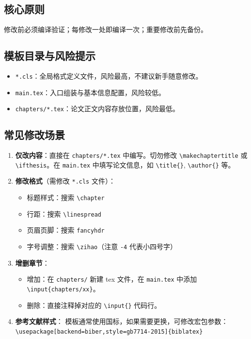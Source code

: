 \subsection{核心原则}
修改前必须编译验证；每修改一处即编译一次；重要修改前先备份。

\subsection{模板目录与风险提示}
\begin{itemize}
    \item \texttt{*.cls}：全局格式定义文件，风险最高，不建议新手随意修改。
    \item \texttt{main.tex}：入口组装与基本信息配置，风险较低。
    \item \texttt{chapters/*.tex}：论文正文内容存放位置，风险最低。
\end{itemize}

\subsection{常见修改场景}
\begin{enumerate}
    \item \textbf{仅改内容}：直接在 \texttt{chapters/*.tex} 中编写。切勿修改 \texttt{\textbackslash makechaptertitle} 或 \texttt{\textbackslash ifthesis}。在 \texttt{main.tex} 中填写论文信息，如 \texttt{\textbackslash title\{\}}, \texttt{\textbackslash author\{\}} 等。
    \item \textbf{修改格式}（需修改 \texttt{*.cls} 文件）：
    \begin{itemize}
        \item 标题样式：搜索 \texttt{\textbackslash chapter}
        \item 行距：搜索 \texttt{\textbackslash linespread}
        \item 页眉页脚：搜索 \texttt{fancyhdr}
        \item 字号调整：搜索 \texttt{\textbackslash zihao}（注意 \texttt{-4} 代表小四号字）
    \end{itemize}
    \item \textbf{增删章节}：
    \begin{itemize}
        \item 增加：在 \texttt{chapters/} 新建 tex 文件，在 \texttt{main.tex} 中添加 \texttt{\textbackslash input\{chapters/xx\}}。
        \item 删除：直接注释掉对应的 \texttt{\textbackslash input\{\}} 代码行。
    \end{itemize}
    \item \textbf{参考文献样式}：
    模板通常使用国标，如果需要更换，可修改宏包参数：\\
    \texttt{\textbackslash usepackage[backend=biber,style=gb7714-2015]\{biblatex\}}
\end{enumerate}

